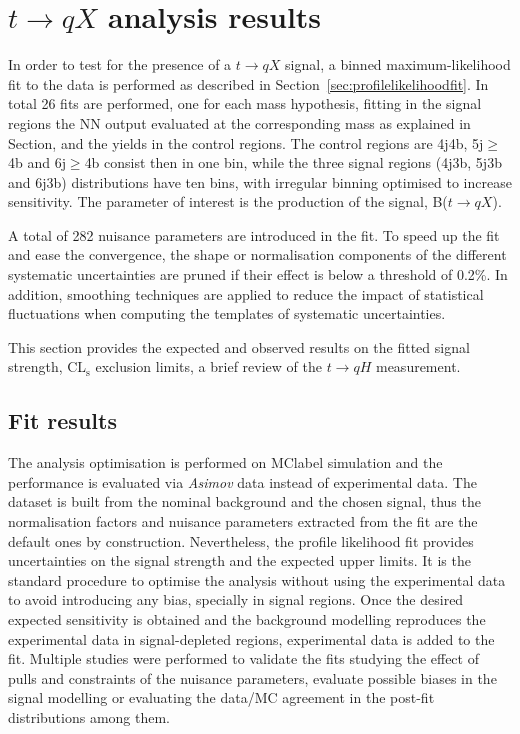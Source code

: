 \chapter{$t\to qX$ analysis results}
In order to test for the presence of a $t\to qX$ signal, a binned maximum-likelihood fit to the data is performed as described in Section~\ref{sec:profilelikelihoodfit}. In total 26 fits are performed, one for each mass hypothesis, fitting in the signal regions the NN output evaluated at the corresponding mass as explained in Section, and the yields in the control regions. The control regions are 4j4b, 5j$\geq$4b and 6j$\geq$4b consist then in one bin, while the three signal regions (4j3b, 5j3b and 6j3b) distributions have ten bins, with irregular binning optimised to increase sensitivity. The parameter of interest is the production of the signal, B($t\to qX$).

A total of 282 nuisance parameters are introduced in the fit. To speed up the fit and ease the convergence, the shape or normalisation components of the different systematic uncertainties are pruned if their effect is below a threshold of 0.2\%. In addition, smoothing techniques are applied to reduce the impact of statistical fluctuations when computing the templates of systematic uncertainties.

This section provides the expected and observed results on the fitted signal strength, CL$_{\text{s}}$ exclusion limits, a brief review of the $t\to qH$ measurement.

\section{Fit results}

The analysis optimisation is performed on \acrshort{MClabel} simulation and the performance is evaluated via \textit{Asimov} data instead of experimental data. The dataset is built from the nominal background and the chosen signal, thus the normalisation factors and nuisance parameters extracted from the fit are the default ones by construction. Nevertheless, the profile likelihood fit provides uncertainties on the signal strength and the expected upper limits. It is the standard procedure to optimise the analysis without using the experimental data to avoid introducing any bias, specially in signal regions. Once the desired expected sensitivity is obtained and the background modelling reproduces the experimental data in signal-depleted regions, experimental data is added to the fit. Multiple studies were performed to validate the fits studying the effect of pulls and constraints of the nuisance parameters, evaluate possible biases in the signal modelling or evaluating the data/MC agreement in the post-fit distributions among them.

